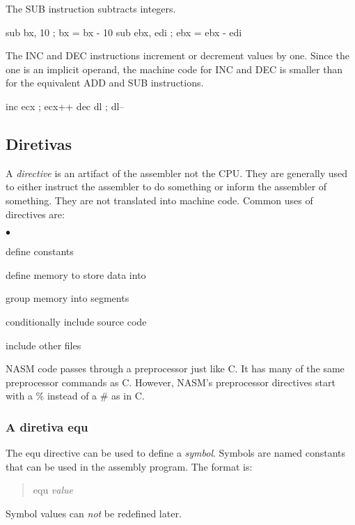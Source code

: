 The {\code SUB}  instruction subtracts integers.
\begin{AsmCodeListing}[frame=none, numbers=none]
      sub    bx, 10   ; bx = bx - 10
      sub    ebx, edi ; ebx = ebx - edi
\end{AsmCodeListing}

The {\code INC}  and {\code DEC}  instructions
increment or decrement values by one. Since the one is an implicit
operand, the machine code for {\code INC} and {\code DEC} is smaller
than for the equivalent {\code ADD} and {\code SUB} instructions.
\begin{AsmCodeListing}[frame=none, numbers=none]
      inc    ecx      ; ecx++
      dec    dl       ; dl--
\end{AsmCodeListing}

\subsection{Diretivas}

A \emph{directive} is an artifact of the assembler not the CPU. They are
generally used to either instruct the assembler to do something or inform
the assembler of something. They are not translated into machine code. Common
uses of directives are:
\begin{list}{$\bullet$}{\setlength{\itemsep}{0pt}}
\item define constants
\item define memory to store data into
\item group memory into segments
\item conditionally include source code
\item include other files
\end{list}

NASM code passes through a preprocessor just like C. It has many of the
same preprocessor commands as C. However, NASM's preprocessor directives
start with a \% instead of a \# as in C.

\subsubsection{A diretiva equ}

The {\code equ} directive can be used to define a \emph{symbol}. Symbols are
named constants that can be used in the assembly program. The format is:
\begin{quote}
   equ {\em value}
\end{quote}
Symbol values can \emph{not} be redefined later.


